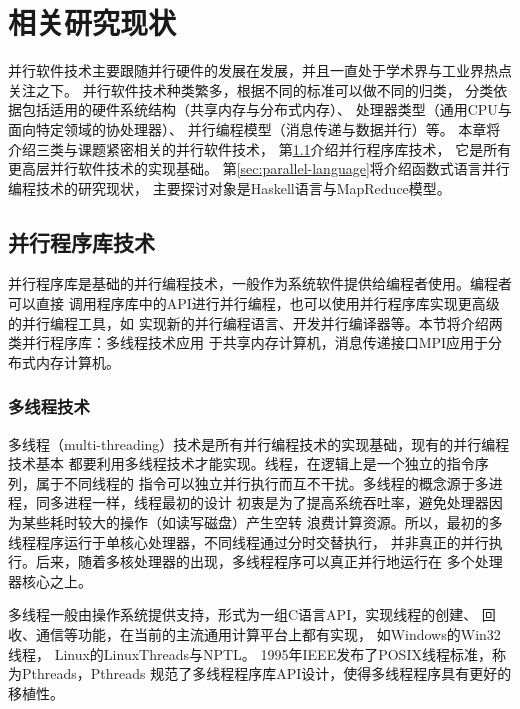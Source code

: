 \chapter{相关研究现状}
并行软件技术主要跟随并行硬件的发展在发展，并且一直处于学术界与工业界热点关注之下。
并行软件技术种类繁多，根据不同的标准可以做不同的归类，
分类依据包括适用的硬件系统结构（共享内存与分布式内存）、
处理器类型（通用CPU与面向特定领域的协处理器）、
并行编程模型（消息传递与数据并行）等。
本章将介绍三类与课题紧密相关的并行软件技术，
第\ref{sec:parallel-library}介绍并行程序库技术，
它是所有更高层并行软件技术的实现基础。
第\ref{sec:parallel-language}将介绍函数式语言并行编程技术的研究现状，
主要探讨对象是Haskell语言与MapReduce模型。

\section{并行程序库技术}\label{sec:parallel-library}
并行程序库是基础的并行编程技术，一般作为系统软件提供给编程者使用。编程者可以直接
调用程序库中的API进行并行编程，也可以使用并行程序库实现更高级的并行编程工具，如
实现新的并行编程语言、开发并行编译器等。本节将介绍两类并行程序库：多线程技术应用
于共享内存计算机，消息传递接口MPI应用于分布式内存计算机。

\subsection{多线程技术}
多线程（multi-threading）技术是所有并行编程技术的实现基础，现有的并行编程技术基本
都要利用多线程技术才能实现。线程，在逻辑上是一个独立的指令序列，属于不同线程的
指令可以独立并行执行而互不干扰。多线程的概念源于多进程，同多进程一样，线程最初的设计
初衷是为了提高系统吞吐率，避免处理器因为某些耗时较大的操作（如读写磁盘）产生空转
浪费计算资源。所以，最初的多线程程序运行于单核心处理器，不同线程通过分时交替执行，
并非真正的并行执行。后来，随着多核处理器的出现，多线程程序可以真正并行地运行在
多个处理器核心之上。

多线程一般由操作系统提供支持，形式为一组C语言API，实现线程的创建、
回收、通信等功能，在当前的主流通用计算平台上都有实现，
如Windows的Win32线程，
Linux的LinuxThreads与NPTL。
1995年IEEE发布了POSIX线程标准，称为Pthreads，Pthreads
规范了多线程程序库API设计，使得多线程程序具有更好的移植性。

